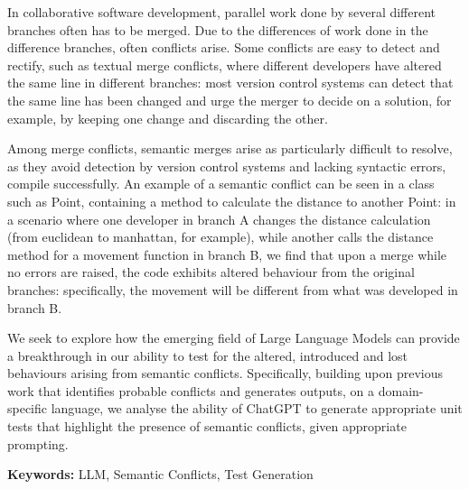 In collaborative software development, parallel work done by several different branches often has to be merged. Due to the differences of work done in the difference branches, often conflicts arise. Some conflicts are easy to detect and rectify, such as textual merge conflicts, where different developers have altered the same line in different branches: most version control systems can detect that the same line has been changed and urge the merger to decide on a solution, for example, by keeping one change and discarding the other.

Among merge conflicts, semantic merges arise as particularly difficult to resolve, as they avoid detection by version control systems and lacking syntactic errors, compile successfully. An example of a semantic conflict can be seen in a class such as Point, containing a method to calculate the distance to another Point: in a scenario where one developer in branch A changes the distance calculation (from euclidean to manhattan, for example), while another calls the distance method for a movement function in branch B, we find that upon a merge while no errors are raised, the code exhibits altered behaviour from the original branches: specifically, the movement will be different from what was developed in branch B.

We seek to explore how the emerging field of Large Language Models can provide a breakthrough in our ability to test for the altered, introduced and lost behaviours arising from semantic conflicts. Specifically, building upon previous work that identifies probable conflicts and generates outputs, on a domain-specific language, we analyse the ability of ChatGPT to generate appropriate unit tests that highlight the presence of semantic conflicts, given appropriate prompting.

\bigskip\noindent
\textbf{Keywords:} LLM, Semantic Conflicts, Test Generation
